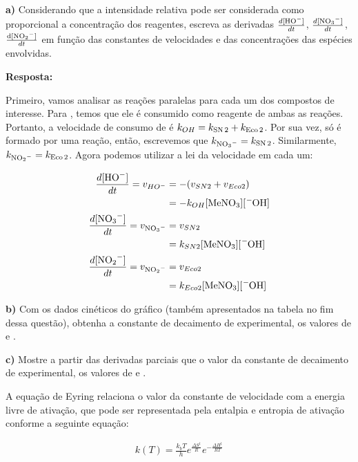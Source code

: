 \textbf{a)} Considerando que a intensidade relativa pode ser considerada como proporcional a concentração dos reagentes, escreva as derivadas \(\frac{d \ce{[HO^-]}}{dt}\), \(\frac{d \ce{[NO3^-]}}{dt}\), \(\frac{ \ce{d[NO2^-]}}{dt}\) em função das constantes de velocidades e das concentrações das espécies envolvidas.

\textbf{Resposta:}

Primeiro, vamos analisar as reações paralelas para cada um dos compostos de interesse. Para , temos que ele é consumido como reagente de ambas as reações. Portanto, a velocidade de consumo de  é \(k_{OH} = k_{ \ce{SN 2}} + k_{\ce{Eco 2}}\). Por sua vez,  só é formado por uma reação, então, escrevemos que \(k_{\ce{NO3^-}} = k_{\ce{SN 2}}\). Similarmente, \(k_{\ce{NO2^-}} = k_{\ce{Eco 2}}\). Agora podemos utilizar a lei da velocidade em cada um:

\begin{align*}
    \frac{d \ce{[HO^-]}}{dt} = v_{HO^-} &= - (v_{SN2} + v_{Eco2})\\
                                        &= - k_{OH}[\ce{MeNO3}][\ce{^-OH}]\\
    \frac{d \ce{[NO3^-]}}{dt} = v_{\ce{NO3^-}} &= v_{SN2}\\
                                               &= k_{SN2}[\ce{MeNO3}][\ce{^-OH}]\\
    \frac{d \ce{[NO2^-]}}{dt} = v_{\ce{NO2^-}} &= v_{Eco2}\\
                                               &= k_{Eco2}[\ce{MeNO3}][\ce{^-OH}]
\end{align*}

\textbf{b)} Com os dados cinéticos do gráfico (também apresentados na tabela no fim dessa questão), obtenha a constante de decaimento de  experimental, os valores de  e .

\textbf{c)} Mostre a partir das derivadas parciais que o valor da constante de decaimento de  experimental, os valores de  e .

A equação de Eyring relaciona o valor da constante de velocidade com a energia livre de ativação, que pode ser representada pela entalpia e entropia de ativação conforme a seguinte equação:

\begin{align*}
    k(T) = \frac{k_b T}{h} e^{\frac{\Delta S^\ddagger}{R}} e^{-\frac{\Delta H^\ddagger}{RT}}   
\end{align*}

